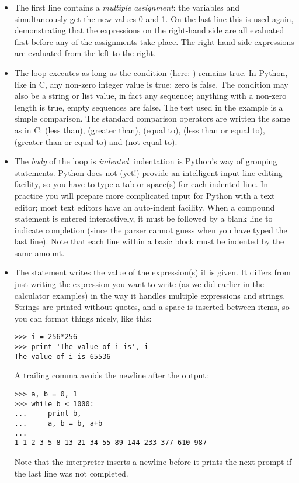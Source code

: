 \documentclass{manual}
\begin{document}
\begin{itemize}

\item
The first line contains a \emph{multiple assignment}: the variables
 and  simultaneously get the new values 0 and 1.  On the
last line this is used again, demonstrating that the expressions on
the right-hand side are all evaluated first before any of the
assignments take place.  The right-hand side expressions are evaluated 
from the left to the right.

\item
The  loop executes as long as the condition (here:
) remains true.  In Python, like in C, any non-zero
integer value is true; zero is false.  The condition may also be a
string or list value, in fact any sequence; anything with a non-zero
length is true, empty sequences are false.  The test used in the
example is a simple comparison.  The standard comparison operators are
written the same as in C: \code{<} (less than), \code{>} (greater than),
\code{==} (equal to), \code{<=} (less than or equal to),
\code{>=} (greater than or equal to) and \code{!=} (not equal to).

\item
The \emph{body} of the loop is \emph{indented}: indentation is Python's
way of grouping statements.  Python does not (yet!) provide an
intelligent input line editing facility, so you have to type a tab or
space(s) for each indented line.  In practice you will prepare more
complicated input for Python with a text editor; most text editors have
an auto-indent facility.  When a compound statement is entered
interactively, it must be followed by a blank line to indicate
completion (since the parser cannot guess when you have typed the last
line).  Note that each line within a basic block must be indented by
the same amount.

\item
The  statement writes the value of the expression(s) it is
given.  It differs from just writing the expression you want to write
(as we did earlier in the calculator examples) in the way it handles
multiple expressions and strings.  Strings are printed without quotes,
and a space is inserted between items, so you can format things nicely,
like this:

\begin{verbatim}
>>> i = 256*256
>>> print 'The value of i is', i
The value of i is 65536
\end{verbatim}

A trailing comma avoids the newline after the output:

\begin{verbatim}
>>> a, b = 0, 1
>>> while b < 1000:
...     print b,
...     a, b = b, a+b
... 
1 1 2 3 5 8 13 21 34 55 89 144 233 377 610 987
\end{verbatim}

Note that the interpreter inserts a newline before it prints the next
prompt if the last line was not completed.

\end{itemize}
\end{document}
